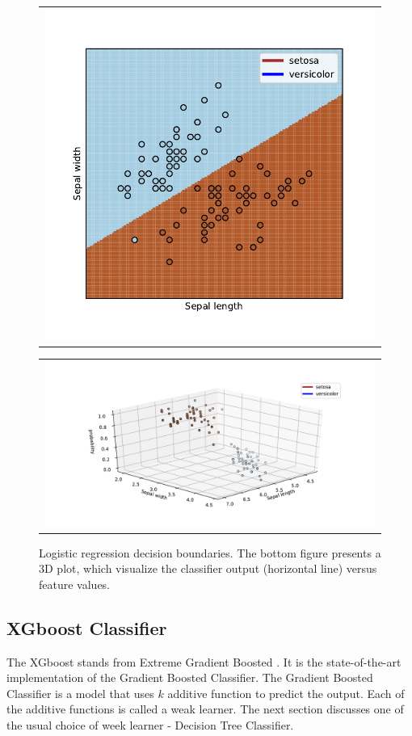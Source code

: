 \begin{figure}
  \centering
  \begin{tabular}{@{}c@{}}
    \includegraphics[width=0.6\linewidth]{figures/decision_boundaries_lr.pdf}
  \end{tabular}

  \vspace{\floatsep}

  \begin{tabular}{@{}c@{}}
    \includegraphics[width=\linewidth]{figures/3D_log_reg.pdf}
  \end{tabular}

  \caption{Logistic regression decision boundaries. The bottom figure presents a 3D plot, which visualize the classifier output (horizontal line) versus feature values.  
\label{fig:LRdecision boundary}}  
\end{figure}



\subsection{XGboost Classifier}
\label{sed:xgboost}
The XGboost stands from Extreme Gradient Boosted \cite{xgboost}. It is the state-of-the-art implementation of the Gradient Boosted Classifier. The Gradient Boosted Classifier is a model that uses $k$ additive function to predict the output.  
Each of the additive functions is called a weak learner. The next section discusses one of the usual choice of week learner - Decision Tree Classifier. 


